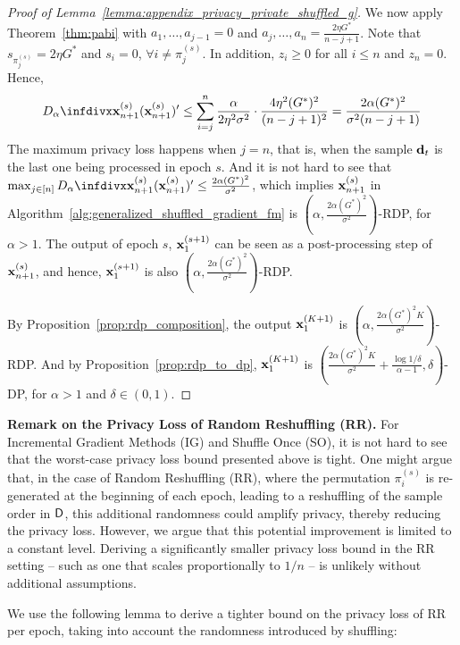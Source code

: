 \begin{proof}[Proof of Lemma~\ref{lemma:appendix_privacy_private_shuffled_g}]
    We now apply Theorem~\ref{thm:pabi} with $a_1, \dots, a_{j-1} = 0$ and $a_{j}, \dots, a_n = \frac{2\eta G^{*}}{n - j + 1}$. Note that $s_{\pi_j^{(s)}} = 2 \eta G^{*}$ and $s_{i} = 0$, $\forall i \neq \pi_j^{(s)}$. In addition, $z_i \geq 0$ for all $i \leq n$ and $z_n = 0$. Hence,
    \begin{align*}
        \infdivalpha{\rvx_{n+1}^{(s)}}{(\rvx_{n+1}^{(s)})'} \leq \sum_{i=j}^{n} \frac{\alpha}{2 \eta^2 \sigma^2} \cdot \frac{4 \eta^2 (G^{*})^2}{(n - j + 1)^2}
        = \frac{2 \alpha (G^{*})^2}{\sigma^2 (n-j + 1)}
    \end{align*}
    The maximum privacy loss happens when $j = n$, that is, when the sample ${\mathbf{d}}_{t}$ is the last one being processed in epoch $s$. 
    And it is not hard to see that $\max_{j\in [n]} \infdivalpha{\rvx_{n+1}^{(s)}}{(\rvx_{n+1}^{(s)})'} \leq \frac{2\alpha (G^*)^2}{\sigma^2}$,
    which implies ${\mathbf{x}}_{n+1}^{(s)}$ in Algorithm~\ref{alg:generalized_shuffled_gradient_fm} is $(\alpha, \frac{2\alpha (G^*)^2}{\sigma^2})$-RDP, for $\alpha > 1$.
    The output of epoch $s$, ${\mathbf{x}}_1^{(s+1)}$ can be seen as a post-processing step of ${\mathbf{x}}_{n+1}^{(s)}$, and hence, ${\mathbf{x}}_1^{(s+1)}$ is also $(\alpha, \frac{2\alpha (G^*)^2}{\sigma^2})$-RDP.
    
    By Proposition~\ref{prop:rdp_composition}, the output ${\mathbf{x}}_1^{(K+1)}$ is $(\alpha, \frac{2\alpha (G^{*})^2 K}{\sigma^2})$-RDP. And by Proposition~\ref{prop:rdp_to_dp}, ${\mathbf{x}}_1^{(K+1)}$ is $(\frac{2\alpha (G^{*})^2 K}{\sigma^2} + \frac{\log 1/\delta}{\alpha - 1}, \delta)$-DP, for $\alpha > 1$ and $\delta \in (0, 1)$.
    
\end{proof}


\textbf{Remark on the Privacy Loss of Random Reshuffling (RR).}
For Incremental Gradient Methods (IG) and Shuffle Once (SO), it is not hard to see that the worst-case privacy loss bound presented above is tight. One might argue that, in the case of Random Reshuffling (RR), where the permutation $\pi_i^{(s)}$ is re-generated at the beginning of each epoch, leading to a reshuffling of the sample order in ${\mathsf{D}}$, this additional randomness could amplify privacy, thereby reducing the privacy loss. However, we argue that this potential improvement is limited to a constant level. 
Deriving a significantly smaller privacy loss bound in the RR setting -- such as one that scales proportionally to $1/n$ -- is unlikely without additional assumptions.

We use the following lemma to derive a tighter bound on the privacy loss of RR per epoch, taking into account the randomness introduced by shuffling:

